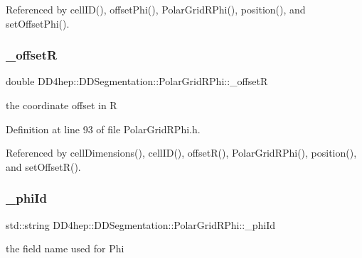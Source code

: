 Referenced by cell\+I\+D(), offset\+Phi(), Polar\+Grid\+R\+Phi(), position(), and set\+Offset\+Phi().

\hypertarget{class_d_d4hep_1_1_d_d_segmentation_1_1_polar_grid_r_phi_aea2278c6ee89eedb09b9ef2fce3a8de0}{}\label{class_d_d4hep_1_1_d_d_segmentation_1_1_polar_grid_r_phi_aea2278c6ee89eedb09b9ef2fce3a8de0} 
\subsubsection{\texorpdfstring{\+\_\+offsetR}{\_offsetR}}
{\footnotesize\ttfamily double D\+D4hep\+::\+D\+D\+Segmentation\+::\+Polar\+Grid\+R\+Phi\+::\+\_\+offsetR\hspace{0.3cm}{\ttfamily [protected]}}



the coordinate offset in R 



Definition at line 93 of file Polar\+Grid\+R\+Phi.\+h.



Referenced by cell\+Dimensions(), cell\+I\+D(), offset\+R(), Polar\+Grid\+R\+Phi(), position(), and set\+Offset\+R().

\hypertarget{class_d_d4hep_1_1_d_d_segmentation_1_1_polar_grid_r_phi_aeb72e70920f4eb466de969281d984053}{}\label{class_d_d4hep_1_1_d_d_segmentation_1_1_polar_grid_r_phi_aeb72e70920f4eb466de969281d984053} 
\subsubsection{\texorpdfstring{\+\_\+phi\+Id}{\_phiId}}
{\footnotesize\ttfamily std\+::string D\+D4hep\+::\+D\+D\+Segmentation\+::\+Polar\+Grid\+R\+Phi\+::\+\_\+phi\+Id\hspace{0.3cm}{\ttfamily [protected]}}



the field name used for Phi 



